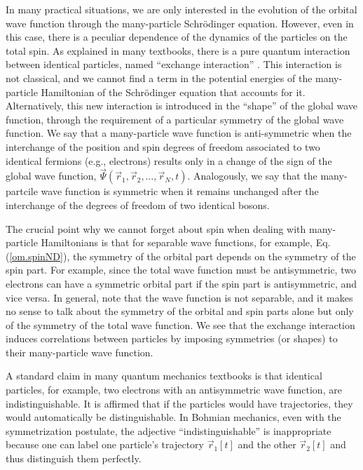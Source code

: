 \documentclass[onecolumn,nofootinbib, secnumarabic, amsmath, nobibnotes,12pt,aps,pra]{revtex4-1}
\newcommand{\eref}[1]{Eq. (\ref{#1})}
\begin{document}
In many practical situations, we are only interested in the
evolution of the orbital wave function through the many-particle
Schr\"odinger equation. However, even in this case, there is a
peculiar dependence of the dynamics of the particles on the total
spin. As explained in many textbooks, there is a pure quantum
interaction between identical particles, named ``exchange
interaction'' \cite{om.sakurai94,om.landaulif}. This interaction is
not classical, and we cannot find a term in the potential energies
of the many-particle Hamiltonian of the Schr\"odinger equation that
accounts for it. Alternatively, this new interaction is introduced
in the ``shape'' of the global wave function, through the
requirement of a particular symmetry of the global wave function. We
say that a many-particle wave function is anti-symmetric when the interchange of
the position and spin degrees of freedom associated to two
identical fermions (e.g., electrons) results only in a change of the
sign of the global wave function, $\vec \Psi(\vec r_1,\vec
r_2,\ldots,\vec r_N,t)$. Analogously, we say that the
many-partcile wave function is symmetric when it
remains unchanged after the interchange of the degrees of freedom of
two identical  bosons.

The crucial point why we cannot forget about spin when dealing with
many-particle Hamiltonians is that for separable wave
functions, for example, \eref{om.spinND}, the symmetry of the
orbital part depends on the symmetry of the spin part. For example,
since the total wave function must be antisymmetric, two electrons
can have a symmetric orbital part if the spin part is antisymmetric,
and vice versa. In general, note that the wave function is not
separable, and it makes no sense to talk about the symmetry of the
orbital and spin parts alone but only of the symmetry of the total
wave function. We see that the exchange interaction induces
correlations between particles by imposing symmetries (or shapes) to
their many-particle wave function.\enlargethispage{-1pc}

A standard claim in many quantum mechanics textbooks is that identical particles, for example, two electrons with an antisymmetric wave function, are indistinguishable. It is affirmed that if the particles would have trajectories, they would automatically be distinguishable. In Bohmian mechanics, even with the symmetrization postulate, the adjective ``indistinguishable'' is inappropriate because one can label one particle's trajectory $\vec r_1[t]$ and the other $\vec r_2[t]$ and thus distinguish them perfectly.
\end{document}
